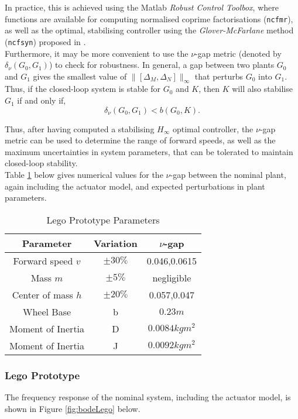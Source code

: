 In practice, this is achieved using the Matlab \textit{Robust Control Toolbox}, where functions are available for computing normalised coprime factorisations (\texttt{ncfmr}), as well as the optimal, stabilising controller using the \textit{Glover-McFarlane} method (\texttt{ncfsyn}) proposed in \cite{hinf}. \\

Furthermore, it may be more convenient to use the $\nu$-gap metric (denoted by $\delta_{\nu}(G_0,G_1)$) to check for robustness. In general, a gap between two plants $G_0$ and $G_1$ gives the smallest value of $\lVert [\Delta_M, \Delta_N] \rVert_{\infty}$ that perturbs $G_0$ into $G_1$. Thus, if the closed-loop system is stable for $G_0$ and $K$, then $K$ will also stabilise $G_1$ if and only if,
\begin{equation*}
\delta_{\nu}(G_0,G_1) < b(G_0,K).
\end{equation*}

Thus, after having computed a stabilising $H_{\infty}$ optimal controller, the $\nu$-gap metric can be used to determine the range of forward speeds, as well as the maximum uncertainties in system parameters, that can be tolerated to maintain closed-loop stability. \\
Table \ref{table:nugap} below gives numerical values for the $\nu$-gap between the nominal plant, again including the actuator model, and expected perturbations in plant parameters.

\begin{table}[H]
	\centering
 	\begin{tabular}{||c c c||} 
 	\hline
 	\textbf{Parameter} & \textbf{Variation} & \textbf{$\nu$-gap} \\ [0.5ex] 
 	\hline\hline
 	Forward speed $v$ & $\pm 30\%$ & 0.046,0.0615  \\
 	\hline
 	Mass $m$ & $\pm 5\%$ & negligible \\ 
 	\hline
 	Center of mass $h$ & $\pm 20\%$ & 0.057,0.047 \\
 	\hline
 	Wheel Base & b & $0.23m$ \\
 	\hline
 	Moment of Inertia & D & $0.0084 kgm^2$ \\
 	\hline
 	Moment of Inertia & J & $0.0092 kgm^2$ \\
 	\hline
	\end{tabular}
 	\caption{Lego Prototype Parameters}
 	\label{table:nugap}
\end{table}

\subsubsection{Lego Prototype}
The frequency response of the nominal system, including the actuator model, is shown in Figure \ref{fig:bodeLego} below.

